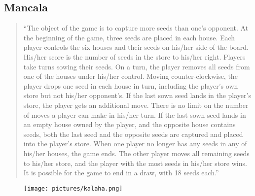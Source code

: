 \subsection{Mancala}


\begin{quote}
``The object of the game is to capture more seeds than one's opponent.
At the beginning of the game, three seeds are placed in each house.
Each player controls the six houses and their seeds on his/her side of the board. His/her score is the number of seeds in the store to his/her right.
Players take turns sowing their seeds. On a turn, the player removes all seeds from one of the houses under his/her control. Moving counter-clockwise, the player drops one seed in each house in turn, including the player's own store but not his/her opponent's.
If the last sown seed lands in the player's store, the player gets an additional move. There is no limit on the number of moves a player can make in his/her turn.
If the last sown seed lands in an empty house owned by the player, and the opposite house contains seeds, both the last seed and the opposite seeds are captured and placed into the player's store.
When one player no longer has any seeds in any of his/her houses, the game ends. The other player moves all remaining seeds to his/her store, and the player with the most seeds in his/her store wins.
It is possible for the game to end in a draw, with 18 seeds each.''
\end{quote} %

\begin{figure}
\texttt{[image: pictures/kalaha.png]}
\end{figure}

